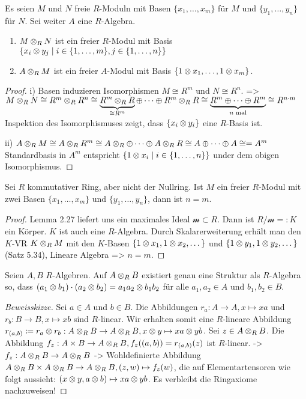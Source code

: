 \documentclass[../main.tex]{subfiles}
\begin{document}
\begin{theorem}
    Es seien $M$ und $N$ freie $R$-Moduln mit Basen $\{x_1,\dots,x_m\}$ für $M$ und $\{y_1,\dots,y_n\}$ für $N$. Sei weiter $A$ eine $R$-Algebra.
    \begin{enumerate}[label=(\roman*)]
        \item $M\otimes_R N$ ist ein freier $R$-Modul mit Basis $\{x_i\otimes y_j\mid i \in \{1,\dots,m\}, j\in \{1,\dots,n\}\}$
        \item $A\otimes_R M$ ist ein freier $A$-Modul mit Basis $\{1\otimes x_1,\dots,1\otimes x_m\}$.
    \end{enumerate}
\end{theorem}
\begin{proof}
i)
    Basen induzieren Isomorphismen $M\cong R^m$ und $N\cong R^n$.
    => $M\otimes_R N\cong R^m \otimes_R R^n \cong \underbrace{R^m \otimes_R R}_{\cong R^m} \oplus \dots \oplus R^m \otimes_R R \cong \underbrace{R^m\oplus\dots\oplus R^m}_{n\text{ mal}} \cong R^{n\cdot m}$
    Inspektion des Isomorphismuses zeigt, dass $\{x_i\otimes y_i\}$ eine $R$-Basis ist.

    ii)
    $A \otimes_R M \cong A \otimes_R R^m \cong A\otimes_R\oplus \dots \oplus A \otimes_R R \cong A\oplus \dots \oplus A \cong = A^m$
    Standardbasis in $A^m$ entspricht $\{1\otimes x_i\mid i\in \{1,\dots, n\}\}$ under dem obigen Isomorphismus.
\end{proof}

\begin{corollary}
    Sei $R$ kommutativer Ring, aber nicht der Nullring. Ist $M$ ein freier $R$-Modul mit zwei Basen $\{x_1,\dots,x_m\}$ und $\{y_1,\dots,y_n\}$, dann ist $n=m$.
\end{corollary}
\begin{proof}
    Lemma 2.27 liefert uns ein maximales Ideal $\mathcal{m}\subset R$.
    Dann ist $R/\mathcal{m} =: K$ ein Körper. $K$ ist auch eine $R$-Algebra.
    Durch Skalarerweiterung erhält man den $K$-VR $K\otimes_R M$ mit den $K$-Basen $\{1\otimes x_1, 1\otimes x_2,\dots\}$ und $\{1\otimes y_1, 1\otimes y_2,\dots\}$ (Satz 5.34),
    Lineare Algebra => $n=m$.
\end{proof}

\begin{theorem}
    Seien $A,B$ $R$-Algebren.
    Auf $A\otimes_R B$ existiert genau eine Struktur als $R$-Algebra so, dass $(a_1\otimes b_1)\cdot (a_2 \otimes b_2) = a_1a_2 \otimes b_1b_2$ für alle $a_1,a_2\in A$ und $b_1,b_2\in B$.
\end{theorem}
\begin{proof}[Beweisskizze]
    Sei $a\in A$ und $b\in B$.
    Die Abbildungen $r_a:A\rightarrow A, x\mapsto xa$ und $r_b:B\rightarrow B, x\mapsto xb$ sind $R$-linear.
    Wir erhalten somit eine $R$-lineare Abbildung $r_{(a,b)} \coloneqq r_a\otimes r_b: A\otimes_R B \rightarrow A\otimes_R B, x\otimes y\mapsto xa\otimes yb$.
    Sei $z\in A\otimes_R B$. Die Abbildung $f_z: A\times B \rightarrow A\otimes_R B, f_z((a,b)) = r_{(a,b)}(z)$ ist $R$-linear.
    -> $f_z:A\otimes_R B\rightarrow A\otimes_R B$ 
    -> Wohldefinierte Abbildung $A\otimes_R B \times A\otimes_R B \rightarrow A\otimes_R B, (z,w) \mapsto f_z(w)$, die auf Elementartensoren wie folgt aussieht:
    $(x\otimes y, a\otimes b)\mapsto xa\otimes yb$.
    Es verbleibt die Ringaxiome nachzuweisen!
\end{proof}
\end{document}
